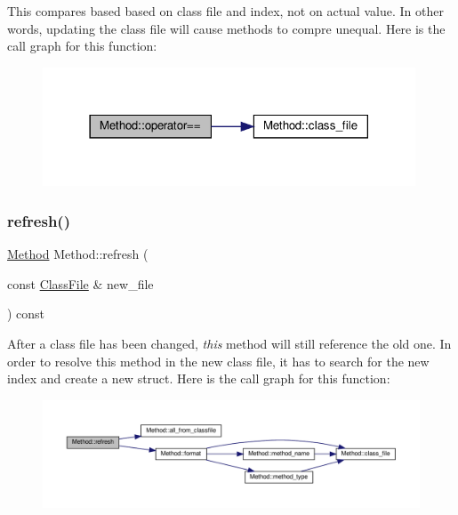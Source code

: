 This compares based based on class file and index, not on actual value. In other words, updating the class file will cause methods to compre unequal. Here is the call graph for this function\+:
\nopagebreak
\begin{figure}[H]
\begin{center}
\leavevmode
\includegraphics[width=314pt]{classMethod_afa02f09f3037782d08463433465181b6_cgraph}
\end{center}
\end{figure}
\mbox{\label{classMethod_ac6a47d5797a62c5ffbb39df54ff7171d}} 
\subsubsection{\texorpdfstring{refresh()}{refresh()}}
{\footnotesize\ttfamily \hyperlink{classMethod}{Method} Method\+::refresh (\begin{DoxyParamCaption}\item[{const \hyperlink{classfile_8h_a00b46b60bc40e813e9fb1bb049174346}{Class\+File} \&}]{new\+\_\+file }\end{DoxyParamCaption}) const}

After a class file has been changed, {\itshape this} method will still reference the old one. In order to resolve this method in the new class file, it has to search for the new index and create a new struct. Here is the call graph for this function\+:
\nopagebreak
\begin{figure}[H]
\begin{center}
\leavevmode
\includegraphics[width=350pt]{classMethod_ac6a47d5797a62c5ffbb39df54ff7171d_cgraph}
\end{center}
\end{figure}
\mbox{\label{classMethod_a52e769352ce657232db3a1b936e930b1}} 
